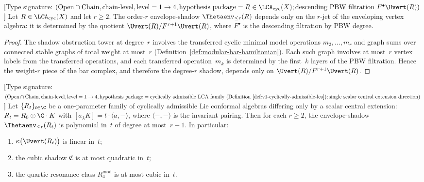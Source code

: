 \begin{proposition}
\label{prop:finite-jet-rigidity-frontier}
\textup{[}Type signature:
$(\mathrm{Open}\cap\mathrm{Chain},\mathrm{chain\text{-}level},
\mathrm{level}=1\to 4,
\mathrm{hypothesis\ package}=R\in\LCA_{\mathrm{cyc}}(X);
\mathrm{descending\ PBW\ filtration}\ F^\bullet\Uvert(R))$\textup{]}
Let $R \in \LCA_{\mathrm{cyc}}(X)$ and let $r \geq 2$.
The order-$r$ envelope-shadow
$\Thetaenv_{\leq r}(R)$
depends only on the $r$-jet of the enveloping vertex algebra:
it is determined by the quotient
$\Uvert(R) / F^{r+1}\Uvert(R)$, where $F^\bullet$ is the
descending filtration by PBW degree.
\end{proposition}

\begin{proof}
The shadow obstruction tower at degree~$r$ involves the transferred
cyclic minimal model operations $m_2, \ldots, m_r$ and graph sums
over connected stable graphs of total weight at most~$r$
(Definition~\ref{def:modular-bar-hamiltonian}).
Each such graph involves at most~$r$ vertex labels from the
transferred operations, and each transferred operation~$m_k$ is
determined by the first~$k$ layers of the PBW filtration.
Hence the weight-$r$ piece of the bar complex, and therefore the
degree-$r$ shadow, depends only on $\Uvert(R) / F^{r+1}\Uvert(R)$.
\end{proof}

\begin{theorem}
\label{thm:level-polynomial}
\textup{[}Type signature:
$(\mathrm{Open}\cap\mathrm{Chain},\mathrm{chain\text{-}level},
\mathrm{level}=1\to 4,
\mathrm{hypothesis\ package}=\mathrm{cyclically\ admissible\ LCA\ family\ \textup{(}Definition~\ref{def:v1-cyclically-admissible-lca}\textup{)}};
\mathrm{single\ scalar\ central\ extension\ direction})$\textup{]}
Let $\{R_t\}_{t \in \C}$ be a one-parameter family of cyclically
admissible Lie conformal algebras differing only by a scalar
central extension: $R_t = R_0 \oplus \C \cdot K$ with
$[a_\lambda K] = t \cdot \langle a, - \rangle$, where
$\langle -, - \rangle$ is the invariant pairing.
Then for each $r \geq 2$, the envelope-shadow
$\Thetaenv_{\leq r}(R_t)$ is polynomial in~$t$ of degree at
most~$r - 1$. In particular:
\begin{enumerate}[label=\textup{(\alph*)}]
\item $\kappa\bigl(\Uvert(R_t)\bigr)$ is linear in~$t$;
\item the cubic shadow $\mathfrak{C}$ is at most quadratic in~$t$;
\item the quartic resonance class
 $R^{\mathrm{mod}}_{4}$ is at most cubic in~$t$.
\end{enumerate}
\end{theorem}

